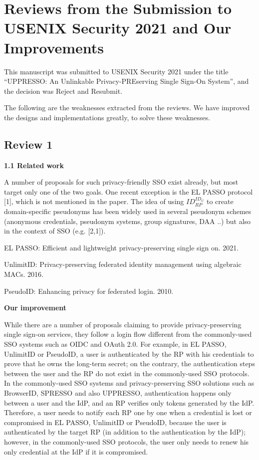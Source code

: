 \documentclass[letterpaper,onecolumn,10pt]{article}
\begin{document}
\section*{Reviews from the Submission to USENIX Security 2021 and Our Improvements}

This manuscript was submitted to USENIX Security 2021 under the title ``UPPRESSO: An Unlinkable Privacy-PREserving Single Sign-On System'',
     and the decision was Reject and Resubmit.

The following are the weaknesses extracted from the reviews.
We have improved the designs and implementations greatly, to solve these weaknesses.

\subsection*{Review 1}
\noindent\textbf{1.1 Related work}

A number of proposals for such privacy-friendly SSO exist already, but most target only one of the two goals.
One recent exception is the EL PASSO protocol [1], which is not mentioned in the paper.
The idea of using $ID_{RP}^{ID_U}$ to create domain-specific pseudonyms has been widely used in several pseudonym schemes (anonymous credentials, pseudonym systems, group signatures, DAA ..) but also in the context of SSO (e.g. [2,1]).

\noindent[1] EL PASSO: Efficient and lightweight privacy-preserving single sign on. 2021.

\noindent[2] UnlimitID: Privacy-preserving federated identity management using algebraic MACs. 2016.

\noindent[3] PseudoID: Enhancing privacy for federated login. 2010.


\vspace{1mm}\noindent\textbf{Our improvement}

While there are a number of proposals claiming to provide privacy-preserving single sign-on services,
    they follow a login flow different from the commonly-used SSO systems such as OIDC and OAuth 2.0.
For example, in EL PASSO, UnlimitID or PseudoID,
    a user is authenticated by the RP with his credentials
            to prove that he owns the long-term secret;
            on the contrary,
    the authentication steps between the user and the RP do not exist in the commonly-used SSO protocols.
In the commonly-used SSO systems and privacy-preserving SSO solutions
    such as BrowserID, SPRESSO and also UPPRESSO,
    authentication happens only between a user and the IdP,
    and an RP verifies only tokens generated by the IdP.
Therefore,
        a user needs to notify each RP one by one when a credential is lost or compromised in EL PASSO, UnlimitID or PseudoID,
    because the user is authenticated by the target RP (in addition to the authentication by the IdP);
    however, in the commonly-used SSO protocols, the user only needs to renew his only credential at the IdP if it is compromised.
\end{document}
